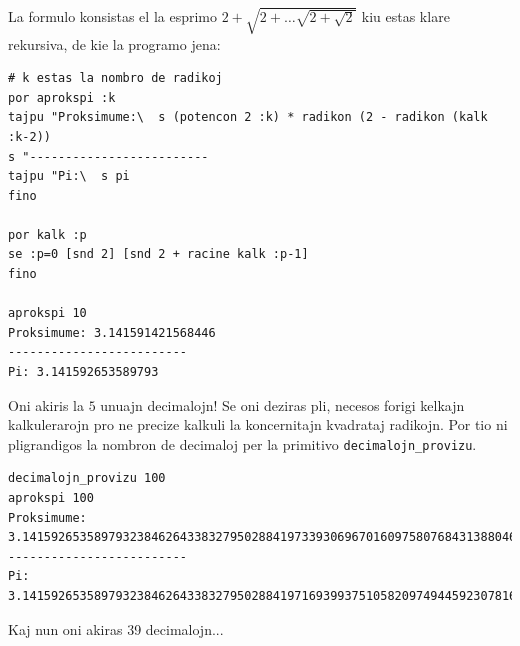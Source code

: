 La formulo konsistas el la esprimo $2+\sqrt{2+\ldots\sqrt{2+\sqrt2}}$
kiu estas klare rekursiva, de kie la programo jena:
\begin{verbatim}
# k estas la nombro de radikoj
por aprokspi :k
tajpu "Proksimume:\  s (potencon 2 :k) * radikon (2 - radikon (kalk :k-2))
s "-------------------------
tajpu "Pi:\  s pi
fino

por kalk :p
se :p=0 [snd 2] [snd 2 + racine kalk :p-1]
fino

aprokspi 10
Proksimume: 3.141591421568446 
------------------------- 
Pi: 3.141592653589793 
\end{verbatim}
Oni akiris la $5$ unuajn decimalojn!  Se oni deziras pli, necesos
forigi kelkajn kalkulerarojn pro ne precize kalkuli la koncernitajn
kvadrataj radikojn.  Por tio ni pligrandigos la nombron de decimaloj
per la primitivo \texttt{decimalojn\_provizu}.
\begin{verbatim}
decimalojn_provizu 100
aprokspi 100
Proksimume: 3.1415926535897932384626433832795028841973393069670160975807684313880468...
------------------------- 
Pi: 3.141592653589793238462643383279502884197169399375105820974944592307816406....
\end{verbatim}
Kaj nun oni akiras 39 decimalojn...
